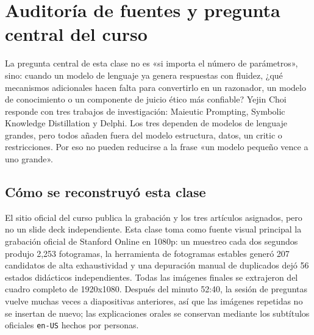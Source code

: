 \section{Auditoría de fuentes y pregunta central del curso}

La pregunta central de esta clase no es «si importa el número de parámetros», sino: cuando un modelo de lenguaje ya genera respuestas con fluidez, ¿qué mecanismos adicionales hacen falta para convertirlo en un razonador, un modelo de conocimiento o un componente de juicio ético más confiable? Yejin Choi responde con tres trabajos de investigación: Maieutic Prompting, Symbolic Knowledge Distillation y Delphi. Los tres dependen de modelos de lenguaje grandes, pero todos añaden fuera del modelo estructura, datos, un critic o restricciones. Por eso no pueden reducirse a la frase «un modelo pequeño vence a uno grande».

\subsection{Cómo se reconstruyó esta clase}

El sitio oficial del curso publica la grabación y los tres artículos asignados, pero no un slide deck independiente. Esta clase toma como fuente visual principal la grabación oficial de Stanford Online en 1080p: un muestreo cada dos segundos produjo 2,253 fotogramas, la herramienta de fotogramas estables generó 207 candidatos de alta exhaustividad y una depuración manual de duplicados dejó 56 estados didácticos independientes. Todas las imágenes finales se extrajeron del cuadro completo de 1920x1080. Después del minuto 52:40, la sesión de preguntas vuelve muchas veces a diapositivas anteriores, así que las imágenes repetidas no se insertan de nuevo; las explicaciones orales se conservan mediante los subtítulos oficiales \texttt{en-US} hechos por personas.

